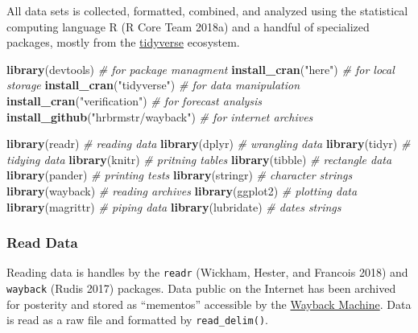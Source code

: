 \documentclass[]{article}
\newenvironment{Shaded}{\begin{snugshade}}{\end{snugshade}}
\newcommand{\CommentTok}[1]{\textcolor[rgb]{0.56,0.35,0.01}{\textit{#1}}}
\newcommand{\KeywordTok}[1]{\textcolor[rgb]{0.13,0.29,0.53}{\textbf{#1}}}
\newcommand{\NormalTok}[1]{#1}
\newcommand{\StringTok}[1]{\textcolor[rgb]{0.31,0.60,0.02}{#1}}
\begin{document}
All data sets is collected, formatted, combined, and analyzed using the
statistical computing language R (R Core Team 2018a) and a handful of
specialized packages, mostly from the
\href{https://www.tidyverse.org/}{tidyverse} ecosystem.

\begin{Shaded}
\begin{Highlighting}[]
\KeywordTok{library}\NormalTok{(devtools) }\CommentTok{# for package managment}
\KeywordTok{install_cran}\NormalTok{(}\StringTok{"here"}\NormalTok{) }\CommentTok{# for local storage}
\KeywordTok{install_cran}\NormalTok{(}\StringTok{"tidyverse"}\NormalTok{) }\CommentTok{# for data manipulation}
\KeywordTok{install_cran}\NormalTok{(}\StringTok{"verification"}\NormalTok{) }\CommentTok{# for forecast analysis}
\KeywordTok{install_github}\NormalTok{(}\StringTok{"hrbrmstr/wayback"}\NormalTok{) }\CommentTok{# for internet archives}
\end{Highlighting}
\end{Shaded}

\begin{Shaded}
\begin{Highlighting}[]
\KeywordTok{library}\NormalTok{(readr)     }\CommentTok{# reading data}
\KeywordTok{library}\NormalTok{(dplyr)     }\CommentTok{# wrangling data}
\KeywordTok{library}\NormalTok{(tidyr)     }\CommentTok{# tidying data}
\KeywordTok{library}\NormalTok{(knitr)     }\CommentTok{# pritning tables}
\KeywordTok{library}\NormalTok{(tibble)    }\CommentTok{# rectangle data}
\KeywordTok{library}\NormalTok{(pander)    }\CommentTok{# printing tests}
\KeywordTok{library}\NormalTok{(stringr)   }\CommentTok{# character strings}
\KeywordTok{library}\NormalTok{(wayback)   }\CommentTok{# reading archives}
\KeywordTok{library}\NormalTok{(ggplot2)   }\CommentTok{# plotting data}
\KeywordTok{library}\NormalTok{(magrittr)  }\CommentTok{# piping data}
\KeywordTok{library}\NormalTok{(lubridate) }\CommentTok{# dates strings}
\end{Highlighting}
\end{Shaded}

\hypertarget{read-data}{%
\subsubsection{Read Data}\label{read-data}}

Reading data is handles by the \texttt{readr} (Wickham, Hester, and
Francois 2018) and \texttt{wayback} (Rudis 2017) packages. Data public
on the Internet has been archived for posterity and stored as
``mementos'' accessible by the \href{https://archive.org/web/}{Wayback
Machine}. Data is read as a raw file and formatted by
\texttt{read\_delim()}.
\end{document}
